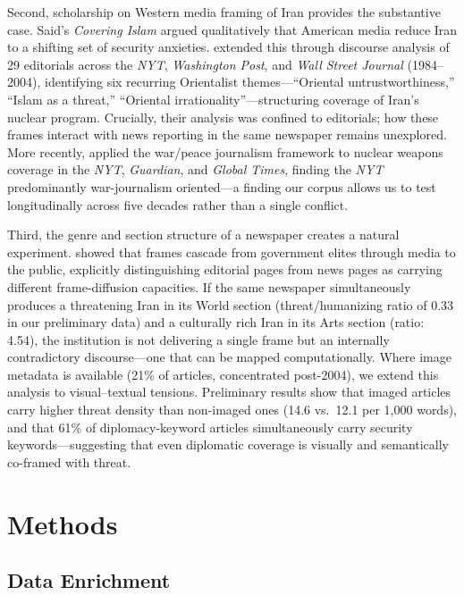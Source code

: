 \documentclass{dhnbpub}
\begin{document}
Second, scholarship on Western media framing of Iran provides the substantive case. Said's \emph{Covering Islam} \citeyearpar{Said1981} argued qualitatively that American media reduce Iran to a shifting set of security anxieties. \citet{Izadi2007} extended this through discourse analysis of 29 editorials across the \emph{NYT}, \emph{Washington Post}, and \emph{Wall Street Journal} (1984--2004), identifying six recurring Orientalist themes---``Oriental untrustworthiness,'' ``Islam as a threat,'' ``Oriental irrationality''---structuring coverage of Iran's nuclear program. Crucially, their analysis was confined to editorials; how these frames interact with news reporting in the same newspaper remains unexplored. More recently, \citet{Guo2025} applied the war/peace journalism framework to nuclear weapons coverage in the \emph{NYT}, \emph{Guardian}, and \emph{Global Times}, finding the \emph{NYT} predominantly war-journalism oriented---a finding our corpus allows us to test longitudinally across five decades rather than a single conflict.

Third, the genre and section structure of a newspaper creates a natural experiment. \citet{Entman2004} showed that frames cascade from government elites through media to the public, explicitly distinguishing editorial pages from news pages as carrying different frame-diffusion capacities. If the same newspaper simultaneously produces a threatening Iran in its World section (threat/humanizing ratio of 0.33 in our preliminary data) and a culturally rich Iran in its Arts section (ratio: 4.54), the institution is not delivering a single frame but an internally contradictory discourse---one that can be mapped computationally. Where image metadata is available (21\% of articles, concentrated post-2004), we extend this analysis to visual--textual tensions. Preliminary results show that imaged articles carry higher threat density than non-imaged ones (14.6 vs.\ 12.1 per 1,000 words), and that 61\% of diplomacy-keyword articles simultaneously carry security keywords---suggesting that even diplomatic coverage is visually and semantically co-framed with threat.

\section{Methods}

\subsection{Data Enrichment}
\end{document}
